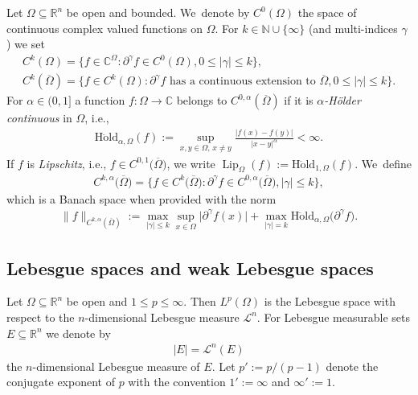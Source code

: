 \documentclass[pdftex]{sigma}
\numberwithin{equation}{section}
\def\al{\alpha}
\def\ga{\gamma}
\def\Om{\Omega}
\def\C{\mathbb{C}}
\def\N{\mathbb{N}}
\def\R{\mathbb{R}}
\def\cL{\mathcal{L}}
\def\p{\partial}
\def\ol{\overline}
\def\Hoeld{\on{H\ddot{o}ld}}
\def\Lip{\on{Lip}}
\let\on=\operatorname
\begin{document}
Let $\Om \subseteq \R^n$ be open and bounded. We~denote by $C^0(\Om)$ the space of continuous complex valued functions on $\Om$.
For $k \in \N \cup \{\infty\}$ (and multi-indices $\ga$) we set
\begin{gather*}
 C^k(\Om)= \big\{f \in \C^\Om \colon \p^\ga f \in C^0(\Om), 0 \le |\ga| \le k\big\},
 \\
 C^k(\overline \Om) = \big\{f \in C^k(\Om) \colon \p^\ga f \text{ has a continuous extension to } \overline \Om, 0 \le |\ga| \le k\big\}.
\end{gather*}
For $\al \in (0,1]$ a function $f \colon \Om \to \C$ belongs to $C^{0,\al}(\overline \Om)$ if it is \emph{$\al$-H\"older continuous}
in $\Om$, i.e.,
\begin{gather*}
\Hoeld_{\al,\Om}(f) := \sup_{x,y \in \Om,\, x \ne y} \frac{|f(x)-f(y)|}{|x-y|^\al} < \infty.
\end{gather*}
If $f$ is \emph{Lipschitz}, i.e., $f \in C^{0,1}\big(\ol \Om\big)$, we write
$\Lip_\Om (f) :=\Hoeld_{1,\Om}(f)$. We~define
\begin{gather*}
 C^{k,\al}\big(\overline \Om\big) =\big \{f \in C^k\big(\overline \Om\big) \colon \p^\ga f \in C^{0,\al}\big(\overline \Om\big), |\ga|\le k\big\},
\end{gather*}
which is a Banach space when provided with the norm
\begin{gather*}
\|f\|_{C^{k,\al}(\overline \Om)}
:= \max_{|\ga| \le k} \sup_{x \in \Om} \big|\p^\ga f(x)\big| + \max_{|\ga|=k} \Hoeld_{\al,\Om}\big(\p^\ga f\big).
\end{gather*}

\subsection{Lebesgue spaces and weak Lebesgue spaces} %

Let $\Om \subseteq \R^n$ be open and $1 \le p \le \infty$.
Then $L^p(\Om)$ is the Lebesgue space with respect to the $n$-dimensional Lebesgue measure $\cL^n$.
For Lebesgue measurable sets $E \subseteq \R^n$ we denote by
\begin{gather*}
 |E| = \cL^n(E)
\end{gather*}
the $n$-dimensional Lebesgue measure of $E$.
Let $p' := p/(p-1)$ denote the conjugate exponent of $p$
with the convention $1' := \infty$ and $\infty' :=1$.
\end{document}
